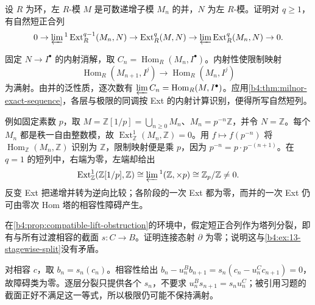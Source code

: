 \begin{exercise}\label{b4:ex:13-milnor-hom-comparison}
	设 \(R\) 为环，左 \(R\)-模 \(M\) 是可数递增子模 \(M_n\) 的并，\(N\) 为左 \(R\)-模。证明对 \(q\ge1\)，有自然短正合列
	\[
		0\to\varprojlim{}^1\operatorname{Ext}_R^{q-1}(M_n,N) \to\operatorname{Ext}_R^q(M,N) \to\varprojlim\operatorname{Ext}_R^q(M_n,N)\to0.
	\]
\end{exercise}
\begin{solution}
	固定 \(N\to I^\bullet\) 的内射消解，取 \(C_n=\operatorname{Hom}_R(M_n,I^\bullet)\)。内射性使限制映射
	\[
		\operatorname{Hom}_R(M_{n+1},I^j)\longrightarrow\operatorname{Hom}_R(M_n,I^j)
	\]
	为满射。由并的泛性质，逐次数有 \(\varprojlim C_n=\operatorname{Hom}_R(M,I^\bullet)\)。应用\cref{b4:thm:milnor-exact-sequence}，各层与极限的同调按 Ext 的内射计算识别，便得所写自然短列。

	例如固定素数 \(p\)，取 \(M=\mathbb Z[1/p]=\bigcup_{n\ge0}M_n\)、\(M_n=p^{-n}\mathbb Z\)，并令 \(N=\mathbb Z\)。每个 \(M_n\) 都是秩一自由整数模，故 \(\operatorname{Ext}_{\mathbb Z}^1(M_n,\mathbb Z)=0\)。用 \(f\mapsto f(p^{-n})\) 将 \(\operatorname{Hom}_{\mathbb Z}(M_n,\mathbb Z)\) 识别为 \(\mathbb Z\)，限制映射便是乘 \(p\)，因为 \(p^{-n}=p\cdot p^{-(n+1)}\)。在 \(q=1\) 的短列中，右端为零，左端却给出
	\[
		\operatorname{Ext}_{\mathbb Z}^1(\mathbb Z[1/p],\mathbb Z) \cong\varprojlim{}^1(\mathbb Z,\times p) \cong\mathbb Z_p/\mathbb Z\ne0.
	\]
	反变 Ext 把递增并转为逆向比较；各阶段的一次 Ext 都为零，而并的一次 Ext 仍可由零次 Hom 塔的相容性障碍产生。
\end{solution}

\begin{exercise}\label{b4:ex:13-boundary-lifting-map}
	在\cref{b4:prop:compatible-lift-obstruction}的环境中，假定短正合列作为塔列分裂，即有与所有过渡相容的截面 \(s:C\to B\)。证明连接态射 \(\partial\) 为零；说明这与\cref{b4:ex:13-stagewise-split}没有矛盾。
\end{exercise}
\begin{solution}
	对相容 \(c\)，取 \(b_n=s_n(c_n)\)。相容性给出 \(b_n-u_n^Bb_{n+1}=s_n(c_n-u_n^Cc_{n+1})=0\)，故障碍类为零。逐层分裂只提供各个 \(s_n\)，不要求 \(u_n^Bs_{n+1}=s_nu_n^C\)；被引用习题的截面正好不满足这一等式，所以极限仍可能不保持满射。
\end{solution}

